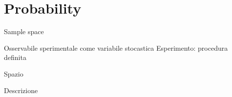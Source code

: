 \section{Probability}

\begin{frame}{Sample space}
\begin{block}{Osservabile sperimentale come variabile stocastica}
Esperimento: procedura definita
\end{block}

\begin{block}{Spazio }

\end{block}

\end{frame}

\begin{wordonframe}{Descrizione}



\end{wordonframe}